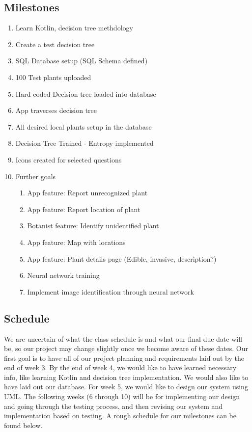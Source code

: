 \documentclass[a4paper]{article}
\begin{document}
\subsection{Milestones}
\begin{enumerate}
\item Learn Kotlin, decision tree methdology
\item Create a test decision tree
\item SQL Database setup (SQL Schema defined)
\item 100 Test plants uploaded
\item Hard-coded Decision tree loaded into database
\item App traverses decision tree
\item All desired local plants setup in the database
\item Decision Tree Trained - Entropy implemented
\item Icons created for selected questions
\item Further goals\begin{enumerate}
\item App feature: Report unrecognized plant
\item App feature: Report location of plant
\item Botanist feature: Identify unidentified plant
\item App feature: Map with locations
\item App feature: Plant details page (Edible, invasive, description?)
\item Neural network training
\item Implement image identification through neural network
\end{enumerate}
\end{enumerate}
\subsection{Schedule}
We are uncertain of what the class schedule is and what our final due date will be, so our project may change slightly once we become aware of these dates. Our first goal is to have all of our project planning and requirements laid out by the end of week 3. By the end of week 4, we would like to have learned necessary info, like learning Kotlin and decision tree implementation. We would also like to have laid out our database. For week 5, we would like to design our system using UML. The following weeks (6 through 10) will be for implementing our design and going through the testing process, and then revising our system and implementation based on testing. A rough schedule for our milestones can be found below.
\end{document}
